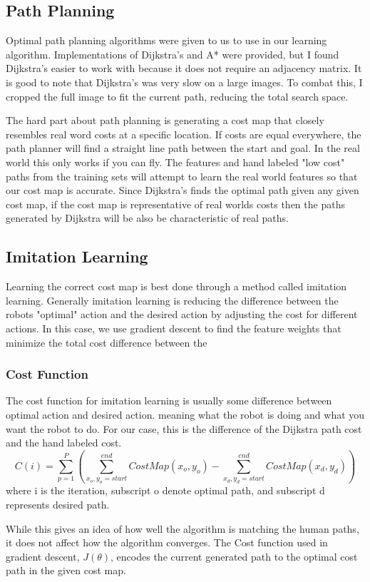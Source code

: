 \documentclass{article}
\begin{document}
\subsection{Path Planning}
\par
Optimal path planning algorithms were given to us to use in our learning algorithm. Implementations of Dijkstra's and A* were provided, but I found Dijkstra's easier to work with because it does not require an adjacency matrix. It is good to note that Dijkstra's was very slow on a large images. To combat this, I cropped the full image to fit the current path, reducing the total search space. 
\par
The hard part about path planning is generating a cost map that closely resembles real word costs at a specific location. If costs are equal everywhere, the path planner will find a straight line path between the start and goal. In the real world this only works if you can fly. The features and hand labeled "low cost" paths from the training sets will attempt to learn the real world features so that our cost map is accurate. Since Dijkstra's finds the optimal path given any given cost map, if the cost map is representative of real worlds costs then the paths generated by Dijkstra will be also be characteristic of real paths.

\subsection{Imitation Learning} 
Learning the correct cost map is best done through a method called imitation learning. Generally imitation learning is reducing the difference between the robots "optimal" action and the desired action by adjusting the cost for different actions. In this case, we use gradient descent to find the feature weights that minimize the total cost difference between the 

\subsubsection{Cost Function}
\par 
The cost function for imitation learning is usually some difference between optimal action and desired action. meaning what the robot is doing and what you want the robot to do. For our case, this is the difference of the Dijkstra path cost and the hand labeled cost. 
$$ C(i) = \sum_{p=1}^{P} \left( \sum_{x_o,y_o = start}^{end}CostMap(x_o,y_o) - \sum_{x_d,y_d = start}^{end}CostMap(x_d,y_d) \right) $$
where i is the iteration, subscript o denote optimal path, and subscript d represents desired path.
\\
\par
While this gives an idea of how well the algorithm is matching the human paths, it does not affect how the algorithm converges. The Cost function used in gradient descent, $J(\theta)$, encodes the current generated path to the optimal cost path in the given cost map.
\end{document}

